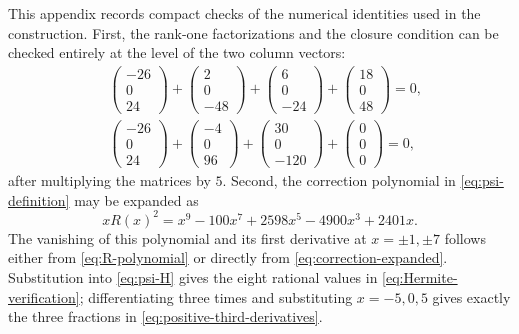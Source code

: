 \documentclass[11pt,reqno]{amsart}
\theoremstyle{definition}
\begin{document}
This appendix records compact checks of the numerical identities used in the
construction.  First, the rank-one factorizations and the closure condition
can be checked entirely at the level of the two column vectors:
\begin{align}
  &\begin{pmatrix}-26\\0\\24\end{pmatrix}
  +\begin{pmatrix}2\\0\\-48\end{pmatrix}
  +\begin{pmatrix}6\\0\\-24\end{pmatrix}
  +\begin{pmatrix}18\\0\\48\end{pmatrix}
  =0,\\
  &\begin{pmatrix}-26\\0\\24\end{pmatrix}
  +\begin{pmatrix}-4\\0\\96\end{pmatrix}
  +\begin{pmatrix}30\\0\\-120\end{pmatrix}
  +\begin{pmatrix}0\\0\\0\end{pmatrix}
  =0,
\end{align}
after multiplying the matrices by $5$.  Second, the correction polynomial in
\cref{eq:psi-definition} may be expanded as
\begin{equation}
  xR(x)^2=x^9-100x^7+2598x^5-4900x^3+2401x.
  \label{eq:correction-expanded}
\end{equation}
The vanishing of this polynomial and its first derivative at
$x=\pm1,\pm7$ follows either from \cref{eq:R-polynomial} or directly from
\cref{eq:correction-expanded}.  Substitution into \cref{eq:psi-H} gives the
eight rational values in \cref{eq:Hermite-verification}; differentiating
three times and substituting $x=-5,0,5$ gives exactly the three fractions in
\cref{eq:positive-third-derivatives}.
\end{document}
